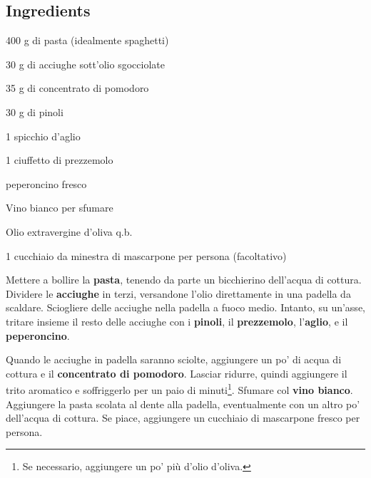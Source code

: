 \newpage
{}

\subsection*{Ingredients}
\begin{ingredients}
	\item 400 g di pasta (idealmente spaghetti)
	\item 30 g di acciughe sott'olio sgocciolate
	\item 35 g di concentrato di pomodoro
	\item 30 g di pinoli
	\item 1 spicchio d'aglio
	\item 1 ciuffetto di prezzemolo
	\item {} peperoncino fresco
	\item Vino bianco per sfumare
	\item Olio extravergine d'oliva q.b.
	\item 1 cucchiaio da minestra di mascarpone per persona (facoltativo)
\end{ingredients}

Mettere a bollire la \textbf{pasta}, tenendo da parte un bicchierino dell'acqua di cottura.
Dividere le \textbf{acciughe} in terzi, versandone l'olio direttamente in una padella da scaldare. 
Sciogliere  delle acciughe nella padella a fuoco medio. 
Intanto, su un'asse, tritare insieme il resto delle acciughe con i \textbf{pinoli}, il \textbf{prezzemolo}, l'\textbf{aglio}, e il \textbf{peperoncino}.

Quando le acciughe in padella saranno sciolte, aggiungere un po' di acqua di cottura e il \textbf{concentrato di pomodoro}.
Lasciar ridurre, quindi aggiungere il trito aromatico e soffriggerlo per un paio di minuti\footnote{Se necessario, aggiungere un po' più d'olio d'oliva.}. 
Sfumare col \textbf{vino bianco}. 
Aggiungere la pasta scolata al dente alla padella, eventualmente con un altro po' dell'acqua di cottura. 
Se piace, aggiungere un cucchiaio di mascarpone fresco per persona. 

